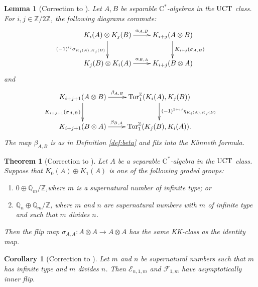 \documentclass[a4paper,10pt]{amsart}
\newcommand{\cstar}{\ensuremath{\mathrm C^\ast}}
\newcounter{theorem}
\newtheorem{thm}[theorem]{Theorem}
\newtheorem{lemma}[theorem]{Lemma}
\newtheorem{cor}[theorem]{Corollary}
\numberwithin{equation}{section}
\numberwithin{theorem}{section}
\newcommand{\Q}{\mathbb{Q}}
\newcommand{\Z}{\mathbb{Z}}
\newcommand{\Tor}{\mathrm{Tor}_1^{\Z}}
\begin{document}
\begin{lemma}[{Correction to \cite[Lemma 4.1]{aifK}}]
\label{lem:KunnethFlipCorrected}
Let $A,B$ be separable $\cstar$-algebras in the $\textup{UCT}$ class.
For $i,j \in \Z /2 \Z$, the following diagrams commute:
\begin{equation}
\label{eq:KunnethFlipDiag1}
\begin{gathered}
\xymatrix{
K_i(A) \otimes K_j(B) \ar[r]^-{\alpha_{A,B}}\ar[d]_-{(-1)^{ij}\sigma_{K_i(A),K_j(B)}} & K_{i+j}(A\otimes B) \ar[d]^-{K_{i+j}(\sigma_{A,B})} \\
K_j(B) \otimes K_i(A) \ar[r]^-{\alpha_{B,A}} & K_{i+j}(B\otimes A) 
}
\end{gathered}
\end{equation}
and
\begin{equation}
\label{eq:KunnethFlipDiag2}
\begin{gathered}
\xymatrix{
K_{i+j+1}(A\otimes B) \ar[r]^-{\beta_{A,B}}\ar[d]_-{K_{i+j+1}(\sigma_{A,B})} & \Tor(K_i(A), K_j(B)) \ar[d]^-{(-1)^{1+ij}\eta_{K_i(A),K_j(B)}}\\
K_{i+j+1}(B\otimes A) \ar[r]^-{\beta_{B,A}} & \Tor(K_j(B), K_i(A)).
} 
\end{gathered}
\end{equation}
The map $\beta_{A,B}$ is as in Definition \ref{def:beta} and fits into the K{\"u}nneth formula.
\end{lemma}

\begin{thm}[{Correction to \cite[Theorem 5.2]{aifK}}]
\label{thm:KKsuff}
Let $A$ be a separable $\cstar$-algebra in the $\textup{UCT}$ class.
Suppose that $K_0(A)\oplus K_1(A)$ is one of the following graded groups:
\begin{enumerate}
\item $0 \oplus \Q_m/\Z$,where $m$ is a supernatural number of infinite type; or
\item $\Q_n \oplus \Q_m/\Z$, where $m$ and $n$ are supernatural numbers with $m$ of infinite type and such that $m$ divides $n$.
\end{enumerate}
Then the flip map $\sigma_{A,A}:A \otimes A \to A \otimes  A$ has the same KK-class as the identity map.
\end{thm}


\begin{cor}[{Correction to \cite[Corollary 5.3]{aifK}}]
\label{cor:Suff}
Let $m$ and $n$ be supernatural numbers such that $m$ has infinite type and $m$ divides $n$.
Then $\mathcal E_{n,1,m}$ and $\mathcal F_{1,m}$ have asymptotically inner flip.
\end{cor}
\end{document}
